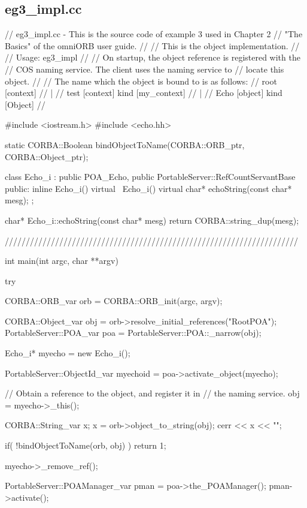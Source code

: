 \documentclass[11pt,twoside,a4paper]{book}
\begin{document}
\clearpage
\subsection{eg3\_impl.cc}

\begin{cxxlisting}
// eg3_impl.cc - This is the source code of example 3 used in Chapter 2
//               "The Basics" of the omniORB user guide.
//
//               This is the object implementation.
//
// Usage: eg3_impl
//
//        On startup, the object reference is registered with the
//        COS naming service. The client uses the naming service to
//        locate this object.
//
//        The name which the object is bound to is as follows:
//              root  [context]
//               |
//              test  [context] kind [my_context]
//               |
//              Echo  [object]  kind [Object]
//

#include <iostream.h>
#include <echo.hh>


static CORBA::Boolean bindObjectToName(CORBA::ORB_ptr, CORBA::Object_ptr);


class Echo_i : public POA_Echo,
	       public PortableServer::RefCountServantBase
{
public:
  inline Echo_i() {}
  virtual ~Echo_i() {}
  virtual char* echoString(const char* mesg);
};


char* Echo_i::echoString(const char* mesg)
{
  return CORBA::string_dup(mesg);
}

//////////////////////////////////////////////////////////////////////

int
main(int argc, char **argv)
{
  try {
    CORBA::ORB_var orb = CORBA::ORB_init(argc, argv);

    CORBA::Object_var obj = orb->resolve_initial_references("RootPOA");
    PortableServer::POA_var poa = PortableServer::POA::_narrow(obj);

    Echo_i* myecho = new Echo_i();

    PortableServer::ObjectId_var myechoid = poa->activate_object(myecho);

    // Obtain a reference to the object, and register it in
    // the naming service.
    obj = myecho->_this();

    CORBA::String_var x;
    x = orb->object_to_string(obj);
    cerr << x << "\n";

    if( !bindObjectToName(orb, obj) )
      return 1;

    myecho->_remove_ref();

    PortableServer::POAManager_var pman = poa->the_POAManager();
    pman->activate();

}}
\end{cxxlisting}
\end{document}
